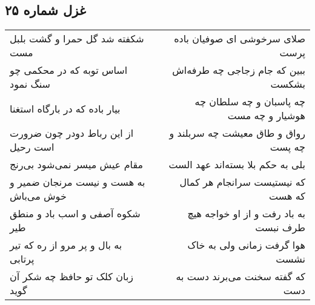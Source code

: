 \begin{center}
\section*{غزل شماره ۲۵}
\label{sec:sh025}
\begin{longtable}{l p{0.5cm} r}
شکفته شد گل حمرا و گشت بلبل مست
&&
صلای سرخوشی ای صوفیان باده پرست
\\
اساس توبه که در محکمی چو سنگ نمود
&&
ببین که جام زجاجی چه طرفه‌اش بشکست
\\
بیار باده که در بارگاه استغنا
&&
چه پاسبان و چه سلطان چه هوشیار و چه مست
\\
از این رباط دودر چون ضرورت است رحیل
&&
رواق و طاق معیشت چه سربلند و چه پست
\\
مقام عیش میسر نمی‌شود بی‌رنج
&&
بلی به حکم بلا بسته‌اند عهد الست
\\
به هست و نیست مرنجان ضمیر و خوش می‌باش
&&
که نیستیست سرانجام هر کمال که هست
\\
شکوه آصفی و اسب باد و منطق طیر
&&
به باد رفت و از او خواجه هیچ طرف نبست
\\
به بال و پر مرو از ره که تیر پرتابی
&&
هوا گرفت زمانی ولی به خاک نشست
\\
زبان کلک تو حافظ چه شکر آن گوید
&&
که گفته سخنت می‌برند دست به دست
\\
\end{longtable}
\end{center}
